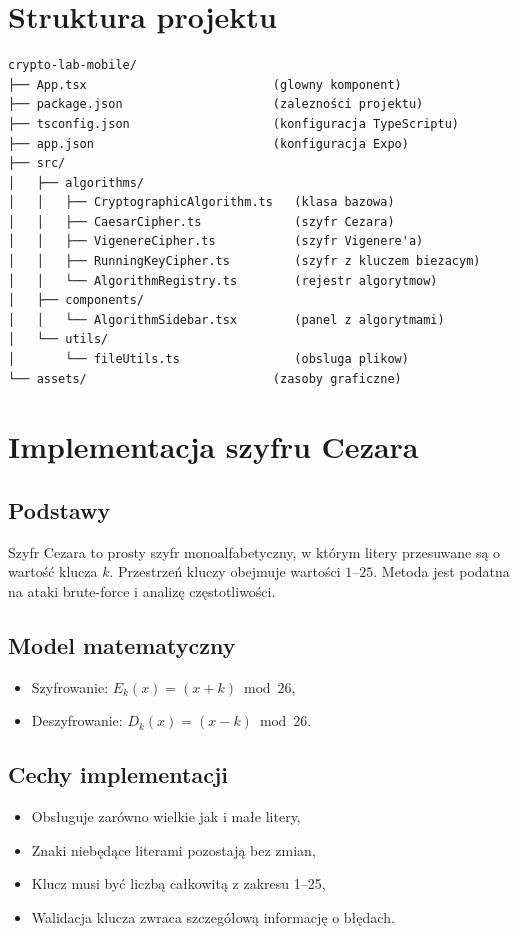 \documentclass[12pt,a4paper]{article}
\begin{document}
\section{Struktura projektu}
\begin{lstlisting}
crypto-lab-mobile/
├── App.tsx                          (glowny komponent)
├── package.json                     (zalezności projektu)
├── tsconfig.json                    (konfiguracja TypeScriptu)
├── app.json                         (konfiguracja Expo)
├── src/
│   ├── algorithms/
│   │   ├── CryptographicAlgorithm.ts   (klasa bazowa)
│   │   ├── CaesarCipher.ts             (szyfr Cezara)
│   │   ├── VigenereCipher.ts           (szyfr Vigenere'a)
│   │   ├── RunningKeyCipher.ts         (szyfr z kluczem biezacym)
│   │   └── AlgorithmRegistry.ts        (rejestr algorytmow)
│   ├── components/
│   │   └── AlgorithmSidebar.tsx        (panel z algorytmami)
│   └── utils/
│       └── fileUtils.ts                (obsluga plikow)
└── assets/                          (zasoby graficzne)
\end{lstlisting}
\section{Implementacja szyfru Cezara}
\subsection{Podstawy}
Szyfr Cezara to prosty szyfr monoalfabetyczny, w którym litery przesuwane są o wartość klucza $k$. 
Przestrzeń kluczy obejmuje wartości $1$--$25$. 
Metoda jest podatna na ataki brute-force i analizę częstotliwości.

\subsection{Model matematyczny}
\begin{itemize}
    \item Szyfrowanie: $E_k(x) = (x + k) \bmod 26$,
    \item Deszyfrowanie: $D_k(x) = (x - k) \bmod 26$.
\end{itemize}

\subsection{Cechy implementacji}
\begin{itemize}
    \item Obsługuje zarówno wielkie jak i małe litery,
    \item Znaki niebędące literami pozostają bez zmian,
    \item Klucz musi być liczbą całkowitą z zakresu 1--25,
    \item Walidacja klucza zwraca szczegółową informację o błędach.
\end{itemize}
\end{document}
